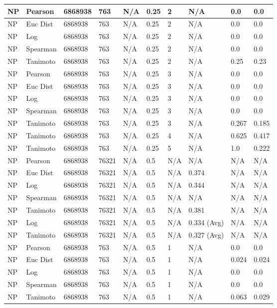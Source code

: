 \documentclass{article}
\begin{document}
\begin{longtable}{ |p{1.7cm}|p{1.9cm}|p{1.5cm}|p{1.5cm}|p{0.75cm}|p{0.75cm}|p{0.75cm}|p{0.75cm}|p{1.5cm}|p{1.5cm}|}
    NP & Pearson & 6868938 & 763 & N/A &  0.25 & 2 & N/A & 0.0 & 0.0  \\ \hline
    NP & Euc Dist & 6868938 & 763 & N/A &  0.25 &  2 & N/A &0.0 & 0.0   \\ \hline
    NP & Log & 6868938 & 763 & N/A &  0.25 &  2 & N/A & 0.0 & 0.0 \\ \hline
    NP & Spearman & 6868938 & 763 & N/A &  0.25 &  2 & N/A & 0.0 & 0.0 \\ \hline
    NP & Tanimoto & 6868938 & 763 & N/A &  0.25 &  2 & N/A & 0.25 & 0.23 \\ \hline
    
    NP & Pearson & 6868938 & 763 & N/A &  0.25 & 3 & N/A & 0.0 & 0.0  \\ \hline
    NP & Euc Dist & 6868938 & 763 & N/A &  0.25 & 3  & N/A &0.0 & 0.0   \\ \hline
    NP & Log & 6868938 & 763 & N/A &  0.25 & 3  & N/A & 0.0 & 0.0  \\ \hline
    NP & Spearman & 6868938 & 763 & N/A &  0.25 & 3  & N/A &0.0 & 0.0 \\ \hline
    NP & Tanimoto & 6868938 & 763 & N/A &  0.25 & 3 & N/A & 0.267 & 0.185 \\ \hline
    NP & Tanimoto & 6868938 & 763 & N/A &  0.25 &  4 & N/A & 0.625 & 0.417 \\ \hline
    NP & Tanimoto & 6868938 & 763 & N/A &  0.25 &  5 & N/A & 1.0 & 0.222 \\ \hline
    
    NP & Pearson & 6868938 & 76321 & N/A &  0.5 & N/A & N/A & N/A & N/A  \\ \hline
    NP & Euc Dist & 6868938 & 76321 & N/A &  0.5 & N/A & 0.374 & N/A & N/A   \\ \hline
    NP & Log & 6868938 & 76321 & N/A &  0.5 & N/A & 0.344 & N/A & N/A  \\ \hline
    NP & Spearman & 6868938 & 76321 & N/A &  0.5 & N/A & N/A & N/A & N/A \\ \hline
    NP & Tanimoto & 6868938 & 76321 & N/A &  0.5 & N/A & 0.381 & N/A & N/A \\ \hline
    NP & Log & 6868938 & 76321 & N/A &  0.5 & N/A & 0.334 (Avg) & N/A & N/A \\ \hline
    NP & Tanimoto & 6868938 & 76321 & N/A &  0.5 & N/A & 0.327 (Avg) & N/A & N/A \\ \hline
    
    NP & Pearson & 6868938 & 763 & N/A &  0.5  & 1 & N/A & 0.0 & 0.0  \\ \hline
    NP & Euc Dist & 6868938 & 763 & N/A &  0.5  & 1 & N/A &0.024 & 0.024   \\ \hline
    NP & Log & 6868938 & 763 & N/A &  0.5  & 1 & N/A & 0.0 & 0.0  \\ \hline
    NP & Spearman & 6868938 & 763 & N/A &  0.5  & 1 & N/A &0.0 & 0.0 \\ \hline
    NP & Tanimoto & 6868938 & 763 & N/A &  0.5  & 1 & N/A & 0.063 & 0.029 \\ \hline
    

\end{longtable}
\end{document}
